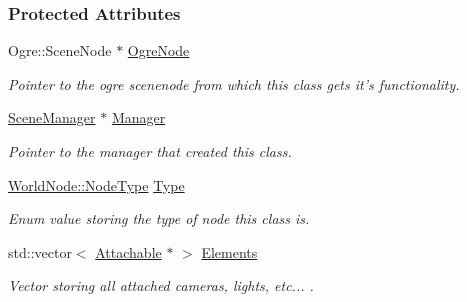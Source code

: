 \subsubsection*{Protected Attributes}
\begin{DoxyCompactItemize}
\item 
\hypertarget{classphys_1_1WorldNode_abc3e4ddcd1dc2f15ffa40ed2d18b5fd8}{
Ogre::SceneNode $\ast$ \hyperlink{classphys_1_1WorldNode_abc3e4ddcd1dc2f15ffa40ed2d18b5fd8}{OgreNode}}
\label{classphys_1_1WorldNode_abc3e4ddcd1dc2f15ffa40ed2d18b5fd8}

\begin{DoxyCompactList}\small\item\em Pointer to the ogre scenenode from which this class gets it's functionality. \item\end{DoxyCompactList}\item 
\hypertarget{classphys_1_1WorldNode_a070f1686f70880dac0241c96518c7a8a}{
\hyperlink{classphys_1_1SceneManager}{SceneManager} $\ast$ \hyperlink{classphys_1_1WorldNode_a070f1686f70880dac0241c96518c7a8a}{Manager}}
\label{classphys_1_1WorldNode_a070f1686f70880dac0241c96518c7a8a}

\begin{DoxyCompactList}\small\item\em Pointer to the manager that created this class. \item\end{DoxyCompactList}\item 
\hypertarget{classphys_1_1WorldNode_aef2329f38799c3d67f1f1f69b35dda20}{
\hyperlink{classphys_1_1WorldNode_a0b178b06aa411b00c4c2ccd926d9bf5a}{WorldNode::NodeType} \hyperlink{classphys_1_1WorldNode_aef2329f38799c3d67f1f1f69b35dda20}{Type}}
\label{classphys_1_1WorldNode_aef2329f38799c3d67f1f1f69b35dda20}

\begin{DoxyCompactList}\small\item\em Enum value storing the type of node this class is. \item\end{DoxyCompactList}\item 
\hypertarget{classphys_1_1WorldNode_a2a17c53f3a7ad3d5bd322855096fcbc3}{
std::vector$<$ \hyperlink{classphys_1_1Attachable}{Attachable} $\ast$ $>$ \hyperlink{classphys_1_1WorldNode_a2a17c53f3a7ad3d5bd322855096fcbc3}{Elements}}
\label{classphys_1_1WorldNode_a2a17c53f3a7ad3d5bd322855096fcbc3}

\begin{DoxyCompactList}\small\item\em Vector storing all attached cameras, lights, etc... . \item\end{DoxyCompactList}\end{DoxyCompactItemize}


